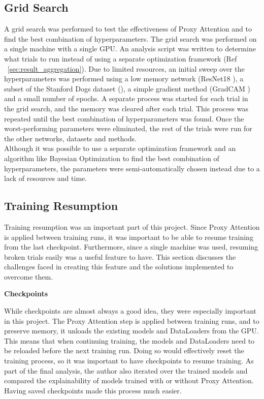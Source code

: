 \documentclass[a4paper,11pt,openright]{book}
\begin{document}
\subsection{Grid Search}
A grid search was performed to test the effectiveness of Proxy Attention and to find the best combination of hyperparameters. The grid search was performed on a single machine with a single GPU. An analysis script was written to determine what trials to run instead of using a separate optimization framework (Ref ~\ref{sec:result_aggregation}).
Due to limited resources, an initial sweep over the hyperparameters was performed using a low memory network (ResNet18 \cite{heDeepResidualLearning2016}), a subset of the Stanford Dogs dataset (\cite{khoslaNovelDatasetFineGrained}), a simple gradient method (GradCAM \cite{selvarajuGradCAMVisualExplanations}) and a small number of epochs. A separate process was started for each trial in the grid search, and the memory was cleared after each trial. This process was repeated until the best combination of hyperparameters was found. Once the worst-performing parameters were eliminated, the rest of the trials were run for the other networks, datasets and methods.\\
Although it was possible to use a separate optimization framework and an algorithm like Bayesian Optimization to find the best combination of hyperparameters, the parameters were semi-automatically chosen instead due to a lack of resources and time.

\subsection{Training Resumption}
Training resumption was an important part of this project. Since Proxy Attention is applied between training runs, it was important to be able to resume training from the last checkpoint. Furthermore, since a single machine was used, resuming broken trials easily was a useful feature to have. This section discusses the challenges faced in creating this feature and the solutions implemented to overcome them.

\textbf{Checkpoints} \label{sec:checkpoints}

While checkpoints are almost always a good idea, they were especially important in this project. The Proxy Attention step is applied between training runs, and to preserve memory, it unloads the existing models and DataLoaders from the GPU. This means that when continuing training, the models and DataLoaders need to be reloaded before the next training run. Doing so would effectively reset the training process, so it was important to have checkpoints to resume training.
As part of the final analysis, the author also iterated over the trained models and compared the explainability of models trained with or without Proxy Attention. Having saved checkpoints made this process much easier.
\end{document}
